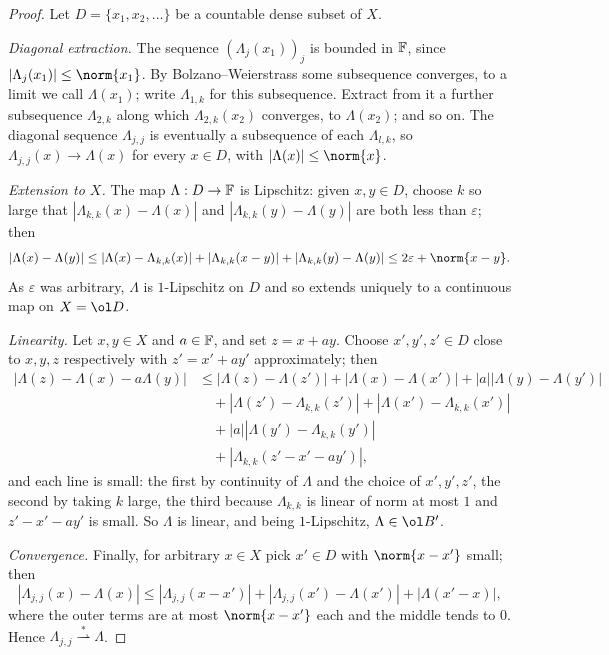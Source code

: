 \documentclass[a4paper]{scrartcl}
\newcommand{\wsto}{\overset{*}{\rightharpoonup}}
\begin{document}
\begin{proof}
	Let $D = \{x_1, x_2, \dots\}$ be a countable dense subset of $X$.

	\emph{Diagonal extraction.} The sequence $(\Lambda_j(x_1))_j$ is bounded in $\mathbb{F}$, since $|\Lambda_j(x_1)| \le \norm{x_1}$. By Bolzano--Weierstrass some subsequence converges, to a limit we call $\Lambda(x_1)$; write $\Lambda_{1,k}$ for this subsequence. Extract from it a further subsequence $\Lambda_{2,k}$ along which $\Lambda_{2,k}(x_2)$ converges, to $\Lambda(x_2)$; and so on. The diagonal sequence $\Lambda_{j,j}$ is eventually a subsequence of each $\Lambda_{l,k}$, so $\Lambda_{j,j}(x) \to \Lambda(x)$ for every $x \in D$, with $|\Lambda(x)| \le \norm{x}$.

	\emph{Extension to $X$.} The map $\Lambda : D \to \mathbb{F}$ is Lipschitz: given $x, y \in D$, choose $k$ so large that $|\Lambda_{k,k}(x)-\Lambda(x)|$ and $|\Lambda_{k,k}(y)-\Lambda(y)|$ are both less than $\varepsilon$; then
	$$|\Lambda(x)-\Lambda(y)| \le |\Lambda(x)-\Lambda_{k,k}(x)| + |\Lambda_{k,k}(x-y)| + |\Lambda_{k,k}(y)-\Lambda(y)| \le 2\varepsilon + \norm{x-y}.$$
	As $\varepsilon$ was arbitrary, $\Lambda$ is $1$-Lipschitz on $D$ and so extends uniquely to a continuous map on $X = \ol D$.

	\emph{Linearity.} Let $x, y \in X$ and $a \in \mathbb{F}$, and set $z = x + ay$. Choose $x', y', z' \in D$ close to $x, y, z$ respectively with $z' = x' + ay'$ approximately; then
	\begin{align*}
		|\Lambda(z) - \Lambda(x)-a\Lambda(y)| &\le |\Lambda(z)-\Lambda(z')| + |\Lambda(x)-\Lambda(x')| + |a| |\Lambda(y)-\Lambda(y')| \\
		&\quad + |\Lambda(z')-\Lambda_{k,k}(z')| + |\Lambda(x')-\Lambda_{k,k}(x')| \\
		&\quad + |a| |\Lambda(y')-\Lambda_{k,k}(y')| \\
		&\quad + |\Lambda_{k,k}(z'-x'-ay')|,
	\end{align*}
	and each line is small: the first by continuity of $\Lambda$ and the choice of $x',y',z'$, the second by taking $k$ large, the third because $\Lambda_{k,k}$ is linear of norm at most $1$ and $z'-x'-ay'$ is small. So $\Lambda$ is linear, and being $1$-Lipschitz, $\Lambda \in \ol B'$.

	\emph{Convergence.} Finally, for arbitrary $x \in X$ pick $x' \in D$ with $\norm{x - x'}$ small; then
	$$|\Lambda_{j,j}(x)-\Lambda(x)| \le |\Lambda_{j,j}(x-x')| + |\Lambda_{j,j}(x')-\Lambda(x')| + |\Lambda(x'-x)|,$$
	where the outer terms are at most $\norm{x-x'}$ each and the middle tends to $0$. Hence $\Lambda_{j,j}\wsto\Lambda$.
\end{proof}
\end{document}
